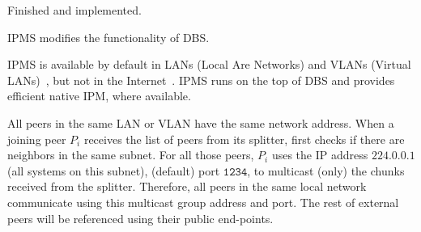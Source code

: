 
\label{sec:IMS}

\begin{notex}
  Finished and implemented.
\end{notex}

IPMS modifies the functionality of DBS.

IPMS is available by default in LANs (Local Are Networks) and VLANs
(Virtual LANs)~\cite{shabtay2011ip}, but not in the
Internet~\cite{Comer1}. IPMS runs on the top of DBS and provides
efficient native IPM, where available.

All peers in the same LAN or VLAN have the same network address. When
a joining peer $P_i$ receives the list of peers from its splitter,
first checks if there are neighbors in the same subnet. For all those
peers, $P_i$ uses the IP address $\mathtt{224.0.0.1}$ (all systems on
this subnet), (default) port $\mathtt{1234}$, to multicast (only) the
chunks received from the splitter. Therefore, all peers in the same
local network communicate using this multicast group address and
port. The rest of external peers will be referenced using their public
end-points.


